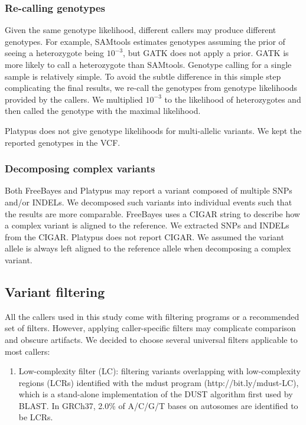 \documentclass{bioinfo}
\begin{document}
\begin{methods}
\subsubsection{Re-calling genotypes} Given the same genotype likelihood,
different callers may produce different genotypes. For example, SAMtools
estimates genotypes assuming the prior of seeing a heterozygote being $10^{-3}$,
but GATK does not apply a prior. GATK is more likely to call a heterozygote
than SAMtools. Genotype calling for a single sample is relatively simple.
To avoid the subtle difference in this simple step complicating the final
results, we re-call the genotypes from genotype likelihoods provided by the
callers.  We multiplied $10^{-3}$ to the likelihood of heterozygotes and then
called the genotype with the maximal likelihood.

Platypus does not give genotype likelihoods for multi-allelic variants. We
kept the reported genotypes in the VCF.

\subsubsection{Decomposing complex variants} Both FreeBayes and Platypus may
report a variant composed of multiple SNPs and/or INDELs. We decomposed such
variants into individual events such that the results are more comparable.
FreeBayes uses a CIGAR string to describe how a complex variant is aligned to
the reference. We extracted SNPs and INDELs from the CIGAR. Platypus does not
report CIGAR. We assumed the variant allele is always left aligned to the
reference allele when decomposing a complex variant.

\subsection{Variant filtering}\label{sec:flt}

All the callers used in this study come with filtering programs or a recommended
set of filters. However, applying caller-specific filters may complicate
comparison and obscure artifacts. We decided to choose several universal
filters applicable to most callers:

\begin{enumerate}

\item Low-complexity filter (LC): filtering variants overlapping with
low-complexity regions (LCRs) identified with the mdust program
(http://bit.ly/mdust-LC), which is a stand-alone implementation of the DUST
algorithm first used by BLAST. In GRCh37, 2.0\% of A/C/G/T bases on autosomes
are identified to be LCRs.


\end{enumerate}
\end{methods}
\end{document}
